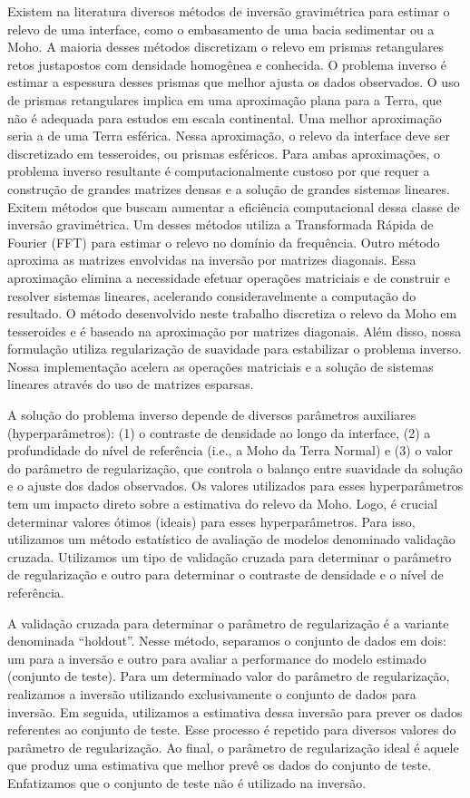 \documentclass[12pt]{letter}
\begin{document}
Existem na literatura diversos métodos de inversão gravimétrica para estimar o
relevo de uma interface, como o embasamento de uma bacia sedimentar ou a Moho.
A maioria desses métodos discretizam o relevo em prismas retangulares retos
justapostos com densidade homogênea e conhecida.
O problema inverso é estimar a espessura desses prismas que melhor ajusta os
dados observados.
O uso de prismas retangulares implica em uma aproximação plana para a Terra,
que não é adequada para estudos em escala continental.
Uma melhor aproximação seria a de uma Terra esférica.
Nessa aproximação, o relevo da interface deve ser discretizado em tesseroides,
ou prismas esféricos.
Para ambas aproximações, o problema inverso resultante é computacionalmente
custoso por que requer a construção de grandes matrizes densas e a solução de
grandes sistemas lineares.
Exitem métodos que buscam aumentar a eficiência computacional dessa classe de
inversão gravimétrica.
Um desses métodos utiliza a Transformada Rápida de Fourier (FFT) para estimar o
relevo no domínio da frequência.
Outro método aproxima as matrizes envolvidas na inversão por matrizes
diagonais.
Essa aproximação elimina a necessidade efetuar operações matriciais e de
construir e resolver sistemas lineares, acelerando consideravelmente a
computação do resultado.
O método desenvolvido neste trabalho discretiza o relevo da Moho em tesseroides
e é baseado na aproximação por matrizes diagonais.
Além disso, nossa formulação utiliza regularização de suavidade para
estabilizar o problema inverso.
Nossa implementação acelera as operações matriciais e a solução de sistemas
lineares através do uso de matrizes esparsas.


A solução do problema inverso depende de diversos parâmetros auxiliares
(hyperparâmetros):
(1) o contraste de densidade ao longo da interface,
(2) a profundidade do nível de referência (i.e., a Moho da Terra Normal)
e
(3) o valor do parâmetro de regularização, que controla o balanço entre
suavidade da solução e o ajuste dos dados observados.
Os valores utilizados para esses hyperparâmetros tem um impacto direto sobre a
estimativa do relevo da Moho.
Logo, é crucial determinar valores ótimos (ideais) para esses hyperparâmetros.
Para isso, utilizamos um método estatístico de avaliação de modelos denominado
validação cruzada.
Utilizamos um tipo de validação cruzada para determinar o parâmetro de
regularização e outro para determinar o contraste de densidade e o nível de
referência.

A validação cruzada para determinar o parâmetro de regularização é a variante
denominada ``holdout''.
Nesse método, separamos o conjunto de dados em dois: um para a inversão e outro
para avaliar a performance do modelo estimado (conjunto de teste).
Para um determinado valor do parâmetro de regularização, realizamos a inversão
utilizando exclusivamente o conjunto de dados para inversão.
Em seguida, utilizamos a estimativa dessa inversão para prever os dados
referentes ao conjunto de teste.
Esse processo é repetido para diversos valores do parâmetro de regularização.
Ao final, o parâmetro de regularização ideal é aquele que produz uma estimativa
que melhor prevê os dados do conjunto de teste.
Enfatizamos que o conjunto de teste não é utilizado na inversão.
\end{document}
